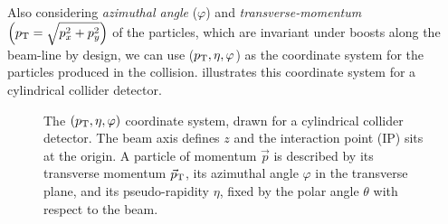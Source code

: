 Also considering \emph{azimuthal angle} (\(\varphi\)) and \emph{transverse-momentum} \(\left(p_{\rm T} = \sqrt{p_x^2 + p_y^2}\right)\) of the particles, which are invariant under boosts along the beam-line by design, we can use (\(p_{\rm T}, \eta, \varphi\)) as the coordinate system for the particles produced in the collision.  illustrates this coordinate system for a cylindrical collider detector. 


\begin{figure}[htbp]
	\centering
	\detectorCoordinateSystem
	\caption{The \((p_{\rm T}, \eta, \varphi)\) coordinate system, drawn for a cylindrical
		collider detector. The beam axis defines \(z\) and the interaction point (IP) sits at
		the origin. A particle of momentum \(\vec{p}\) is described by its transverse momentum
		\(\vec{p}_{\rm T}\), its azimuthal angle \(\varphi\) in the transverse plane, and its
		pseudo-rapidity \(\eta\), fixed by the polar angle \(\theta\) with respect to the beam.}
	\label{fig:detcoords}
\end{figure}

